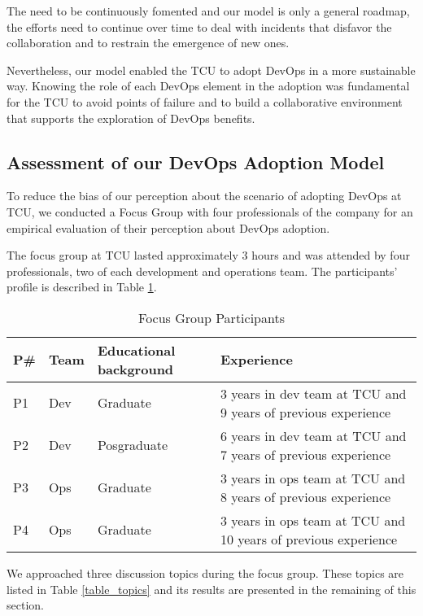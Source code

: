 The \cc need to be continuously fomented and our model is only a general roadmap,
the efforts need to continue over time to deal with incidents that disfavor
the collaboration and to restrain the emergence of new ones.

Nevertheless, our model enabled the TCU to adopt DevOps in a more sustainable
way. Knowing the role of each DevOps element in the adoption was fundamental for
the TCU to avoid points of failure and to build a collaborative environment that
supports the exploration of DevOps benefits.

\subsection{Assessment of our DevOps Adoption Model}

To reduce the bias of our perception about the scenario of adopting DevOps at
TCU, we conducted a Focus Group with four professionals of the company for an
empirical evaluation of their perception about DevOps adoption.

The focus group at TCU lasted approximately 3 hours and was attended by four
professionals, two of each development and operations team. The participants'
profile is described in Table \ref{focusgroup_part}.

\begin{table}[hb!]
\centering
\begin{tabular}{p{0.6cm}p{1.2cm}p{2.5cm}p{6cm}} \toprule
{\bf P\#} & {\bf Team} & {\bf Educational background} & {\bf Experience}\\ \midrule
P1 & Dev & Graduate & 3 years in dev team at TCU and 9 years of previous experience \\ 
P2 & Dev & Posgraduate & 6 years in dev team at TCU and 7 years of previous experience \\ 
P3 & Ops & Graduate & 3 years in ops team at TCU and 8 years of previous experience \\ 
P4 & Ops & Graduate & 3 years in ops team at TCU and 10 years of previous experience \\ \bottomrule
\end{tabular}
\caption{Focus Group Participants}
\label{focusgroup_part}
\end{table}

We approached three discussion topics during the focus group. These topics are
listed in Table \ref{table_topics} and its results are presented in the
remaining of this section.

